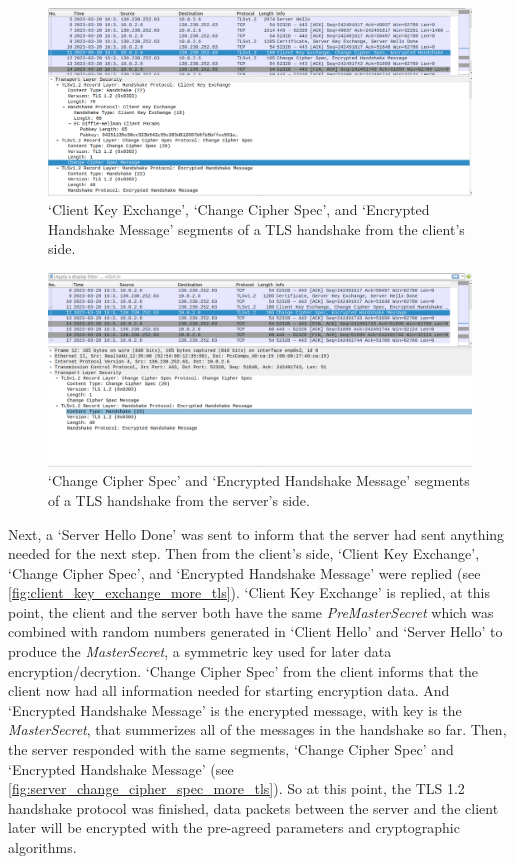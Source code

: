 \begin{figure}
    \centering
    \includegraphics[height=\textheight,width=\textwidth,keepaspectratio]
    {figures/client_key_exchange.png}
    \caption{`Client Key Exchange', `Change Cipher Spec', and `Encrypted Handshake Message'
    segments of a TLS handshake from the client's side.}
    \label{fig:client_key_exchange_more_tls}
\end{figure}

\begin{figure}
    \centering
    \includegraphics[height=\textheight,width=\textwidth,keepaspectratio]
    {figures/server_change_cipher_spec_more.png}
    \caption{`Change Cipher Spec' and `Encrypted Handshake Message' segments of a
    TLS handshake from the server's side.}
    \label{fig:server_change_cipher_spec_more_tls}
\end{figure}

Next, a `Server Hello Done' was sent to inform that the server had sent anything needed
for the next step. Then from the client's side, `Client Key Exchange', `Change Cipher Spec',
and `Encrypted Handshake Message' were replied (see \autoref{fig:client_key_exchange_more_tls}).
`Client Key Exchange' is replied, at this point,
the client and the server both have the same \emph{PreMasterSecret} which was combined with
random numbers generated in `Client Hello' and `Server Hello' to produce the \emph{MasterSecret},
a symmetric key used for later data encryption/decrytion. `Change Cipher Spec' from the client
informs that the client now had all information needed for starting encryption data. And
`Encrypted Handshake Message' is the encrypted message, with key is the \emph{MasterSecret},
that summerizes all of the messages in the handshake so far. Then, the server responded with
the same segments, `Change Cipher Spec' and `Encrypted Handshake Message'
(see \autoref{fig:server_change_cipher_spec_more_tls}). So at this point,
the TLS 1.2 handshake protocol was finished, data packets between the server and the client
later will be encrypted with the pre-agreed parameters and cryptographic algorithms.